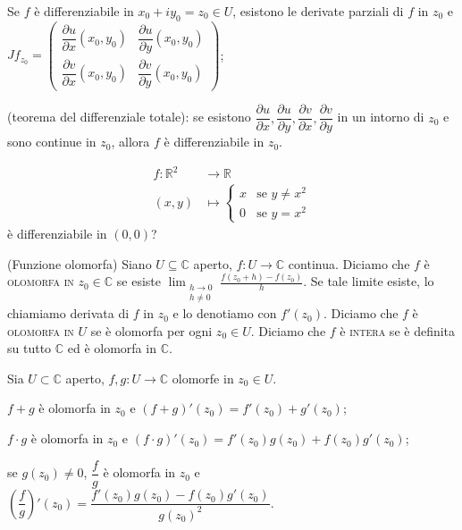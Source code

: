 \begin{ftt}
  \begin{nlist}
    \item Se $f$ è differenziabile in $x_0+iy_0=z_0 \in U$, esistono le derivate parziali di $f$ in $z_0$ e $Jf_{z_0}=\begin{pmatrix}
      \dfrac{\partial u}{\partial x}(x_0, y_0) & \dfrac{\partial u}{\partial y}(x_0, y_0)\\
      \dfrac{\partial v}{\partial x}(x_0, y_0) & \dfrac{\partial v}{\partial y}(x_0, y_0)
  \end{pmatrix}$;
  \item (teorema del differenziale totale): se esistono $\dfrac{\partial u}{\partial x}, \dfrac{\partial u}{\partial y}, \dfrac{\partial v}{\partial x}, \dfrac{\partial v}{\partial y}$ in un intorno di $z_0$ e sono continue in $z_0$, allora $f$ è differenziabile in $z_0$.
  \end{nlist}
\end{ftt}

\begin{exc}
  \begin{align*}
    f:\mathbb{R}^2 &\longrightarrow \mathbb{R}\\
    (x, y) &\longmapsto \begin{cases} x & \mbox{se }y\not=x^2 \\ 0 & \mbox{se }y=x^2 \end{cases}
  \end{align*}
  è differenziabile in $(0, 0)$?
\end{exc}

\begin{defn}
  (Funzione olomorfa) Siano $U \subseteq \mathbb{C}$ aperto, $f:U \longrightarrow \mathbb{C}$ continua. Diciamo che $f$ è \textsc{olomorfa in $z_0 \in \mathbb{C}$} se esiste $\displaystyle \lim_{\substack{h \longrightarrow 0 \\ h\not=0}} \frac{f(z_0+h)-f(z_0)}{h}$. Se tale limite esiste, lo chiamiamo derivata di $f$ in $z_0$ e lo denotiamo con $f'(z_0)$.
  Diciamo che $f$ è \textsc{olomorfa in $U$} se è olomorfa per ogni $z_0 \in U$. Diciamo che $f$ è \textsc{intera} se è definita su tutto $\mathbb{C}$ ed è olomorfa in $\mathbb{C}$.
\end{defn}

\begin{prop}
  Sia $U \subset \mathbb{C}$ aperto, $f, g:U \longrightarrow \mathbb{C}$ olomorfe in $z_0 \in U$.
  \begin{nlist}
    \item $f+g$ è olomorfa in $z_0$ e $(f+g)'(z_0)=f'(z_0)+g'(z_0)$;
    \item $f \cdot g$ è olomorfa in $z_0$ e $(f \cdot g)'(z_0)=f'(z_0)g(z_0)+f(z_0)g'(z_0)$;
    \item se $g(z_0) \not=0$, $\dfrac{f}{g}$ è olomorfa in $z_0$ e $\left(\dfrac{f}{g}\right)'(z_0)=\dfrac{f'(z_0)g(z_0)-f(z_0)g'(z_0)}{g(z_0)^2}$.
  \end{nlist}
\end{prop}

